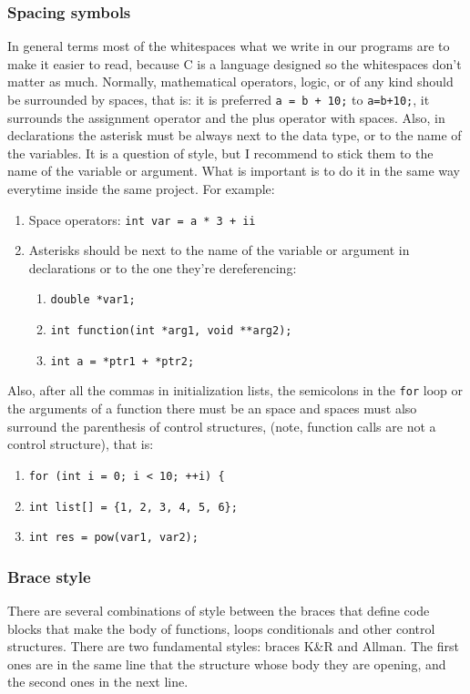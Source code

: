 \documentclass[a4paper]{article}
\begin{document}
\subsubsection{Spacing symbols}
In general terms most of the whitespaces what we write in our programs are to
make it easier to read, because C is a language designed so the whitespaces
don't matter as much. Normally, mathematical operators, logic, or of any kind
should be surrounded by spaces, that is: it is preferred
\lstinline[style=C]!a = b + 10;! to \lstinline[style=C]!a=b+10;!, it surrounds
the assignment operator and the plus operator with spaces. Also, in declarations
the asterisk must be always next to the data type, or to the name of the
variables. It is a question of style, but I recommend to stick them to the
name of the variable or argument. What is important is to do it in the same
way everytime inside the same project.
For example:
\begin{enumerate}
\item Space operators: \lstinline[style=C]!int var = a * 3 + ii!
\item Asterisks should be next to the name of the variable or argument in
declarations or to the one they're dereferencing:
\begin{enumerate}
\item \lstinline[style=C]!double *var1;!
\item \lstinline[style=C]!int function(int *arg1, void **arg2);!
\item \lstinline[style=C]!int a = *ptr1 + *ptr2;!
\end{enumerate}
\end{enumerate}

Also, after all the commas in initialization lists, the semicolons in the
\verb!for! loop or the arguments of a function there must be an space and spaces
must also surround the parenthesis of control structures, (note, function calls
are not a control structure), that is:
\begin{enumerate}
\item \lstinline[style=C]!for (int i = 0; i < 10; ++i)!\verb! {!
\item \lstinline[style=C]!int list[] = {1, 2, 3, 4, 5, 6};!
\item \lstinline[style=C]!int res = pow(var1, var2);!
\end{enumerate}

\subsubsection{Brace style}
There are several combinations of style between the braces that define code
blocks that make the body of functions, loops conditionals and other control
structures. There are two fundamental styles: braces K\&R and Allman. The first
ones are in the same line that the structure whose body they are opening, and
the second ones in the next line.
\end{document}
